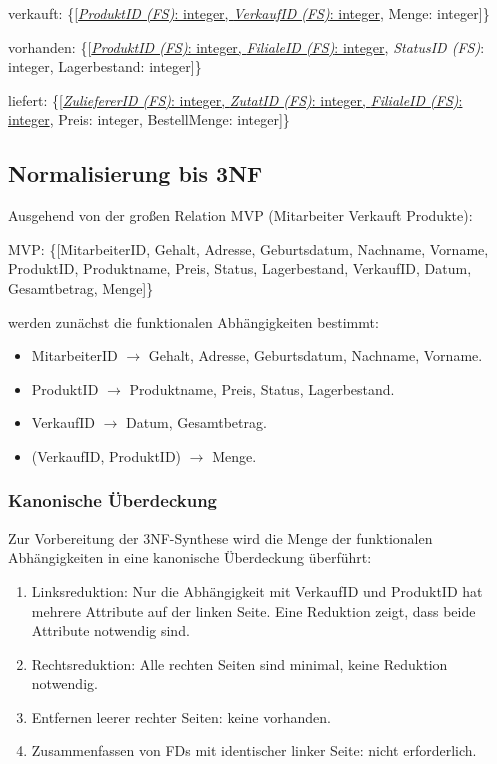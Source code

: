 \documentclass[a4paper]{article}
\begin{document}
verkauft: \{[\underline{\textit{ProduktID (FS)}: integer, \textit{VerkaufID (FS)}: integer}, Menge: integer]\}

vorhanden: \{[\underline{\textit{ProduktID (FS)}: integer, \textit{FilialeID (FS)}: integer}, \textit{StatusID (FS)}: integer, Lagerbestand: integer]\}

liefert: \{[\underline{\textit{ZuliefererID (FS)}: integer, \textit{ZutatID (FS)}: integer, \textit{FilialeID (FS)}: integer}, Preis: integer, BestellMenge: integer]\}

\newpage
\subsection{Normalisierung bis 3NF}

Ausgehend von der großen Relation MVP (Mitarbeiter Verkauft Produkte):

MVP: \{[MitarbeiterID, Gehalt, Adresse, Geburtsdatum, Nachname, Vorname, ProduktID, Produktname, Preis, Status, Lagerbestand, VerkaufID, Datum, Gesamtbetrag, Menge]\}

werden zunächst die funktionalen Abhängigkeiten bestimmt:

\begin{itemize}
    \item MitarbeiterID $\to$ Gehalt, Adresse, Geburtsdatum, Nachname, Vorname.
    \item ProduktID $\to$ Produktname, Preis, Status, Lagerbestand.
    \item VerkaufID $\to$ Datum, Gesamtbetrag.
    \item (VerkaufID, ProduktID) $\to$ Menge.
\end{itemize}

\subsubsection*{Kanonische Überdeckung}

Zur Vorbereitung der 3NF-Synthese wird die Menge der funktionalen Abhängigkeiten in eine kanonische Überdeckung überführt:

\begin{enumerate}
    \item Linksreduktion: Nur die Abhängigkeit mit VerkaufID und ProduktID hat mehrere Attribute auf der linken Seite. Eine Reduktion zeigt, dass beide Attribute notwendig sind. 
    \item Rechtsreduktion: Alle rechten Seiten sind minimal, keine Reduktion notwendig.
    \item Entfernen leerer rechter Seiten: keine vorhanden.
    \item Zusammenfassen von FDs mit identischer linker Seite: nicht erforderlich.
\end{enumerate}
\end{document}
